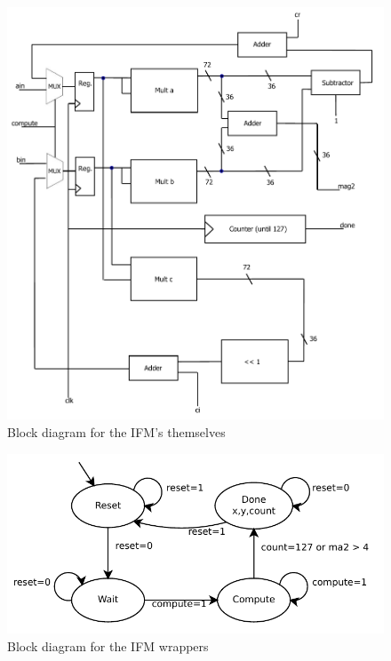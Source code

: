 \documentclass{article}
\begin{document}
\begin{figure}[h!]
  \centering
    \includegraphics[width=\textwidth]{block_diagrams/ifm.pdf}
  \caption{Block diagram for the IFM's themselves}
\end{figure}

\begin{figure}[h!]
  \centering
    \includegraphics[width=\textwidth]{state_diagrams/ifm.pdf}
  \caption{Block diagram for the IFM wrappers}
\end{figure}
\end{document}
